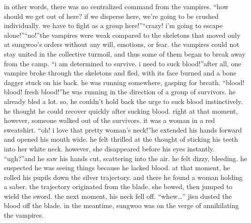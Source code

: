 in other words, there was no centralized command from the vampires.
“how should we get out of here? if we disperse here, we’re going to be crushed individually.
 we have to fight as a group here!”“crazy! i’m going to escape alone!”“no!”the vampires were weak compared to the skeletons that moved only at sungwoo’s orders without any will, emotions, or fear.
the vampires could not stay united in the collective turmoil, and thus some of them began to break away from the camp.
“i am determined to survive.
 i need to suck blood!”after all, one vampire broke through the skeletons and fled, with its face burned and a bone dagger stuck on his back.
 he was running somewhere, gasping for breath.
“blood! blood! fresh blood!”he was running in the direction of a group of survivors.
 he already bled a lot.
so, he couldn’t hold back the urge to suck blood instinctively.
 he thought he could recover quickly after sucking blood.
right at that moment, however, someone walked out of the survivors.
 it was a woman in a red sweatshirt.
“oh! i love that pretty woman’s neck!”he extended his hands forward and opened his mouth wide.
 he felt thrilled at the thought of sticking his teeth into her white neck.
 however, she disappeared before his eyes instantly.
“ugh?”and he saw his hands cut, scattering into the air.
 he felt dizzy, bleeding.
he suspected he was seeing things because he lacked blood.
 at that moment, he rolled his pupils down the silver trajectory.
 and there he found a woman holding a saber.
 the trajectory originated from the blade.
 she bowed, then jumped to wield the sword.
the next moment, his neck fell off.
“whew…” jisu dusted the blood off the blade.
in the meantime, sungwoo was on the verge of annihilating the vampires.

